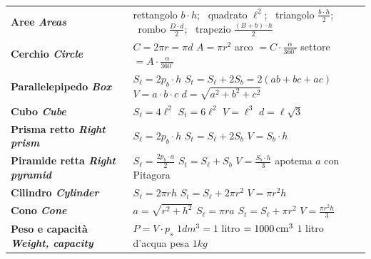 {\begin{tabularx}{\linewidth}{@{}>{\bfseries}p{3.4cm} X@{}}
Aree \newline \textit{\mdseries Areas} & rettangolo $b\cdot h$; \ quadrato $\ell^2$; \ triangolo $\frac{b\cdot h}{2}$; \ rombo $\frac{D\cdot d}{2}$; \ trapezio $\frac{(B+b)\cdot h}{2}$\\
Cerchio \newline \textit{\mdseries Circle} & $C=2\pi r=\pi d$ \qquad $A=\pi r^2$ \qquad arco $=C\cdot\frac{\alpha}{360^\circ}$ \qquad settore $=A\cdot\frac{\alpha}{360^\circ}$\\
Parallelepipedo \newline \textit{\mdseries Box} & $S_\ell=2p_b\cdot h$ \quad $S_t=S_\ell+2S_b=2(ab+bc+ac)$ \quad $V=a\cdot b\cdot c$ \quad $d=\sqrt{a^2+b^2+c^2}$\\
Cubo \newline \textit{\mdseries Cube} & $S_\ell=4\ell^2$ \quad $S_t=6\ell^2$ \quad $V=\ell^3$ \quad $d=\ell\sqrt3$\\
Prisma retto \newline \textit{\mdseries Right prism} & $S_\ell=2p_b\cdot h$ \quad $S_t=S_\ell+2S_b$ \quad $V=S_b\cdot h$\\
Piramide retta \newline \textit{\mdseries Right pyramid} & $S_\ell=\frac{2p_b\cdot a}{2}$ \quad $S_t=S_\ell+S_b$ \quad $V=\frac{S_b\cdot h}{3}$ \quad apotema $a$ con Pitagora\\
Cilindro \newline \textit{\mdseries Cylinder} & $S_\ell=2\pi rh$ \quad $S_t=S_\ell+2\pi r^2$ \quad $V=\pi r^2h$\\
Cono \newline \textit{\mdseries Cone} & $a=\sqrt{r^2+h^2}$ \quad $S_\ell=\pi ra$ \quad $S_t=S_\ell+\pi r^2$ \quad $V=\frac{\pi r^2h}{3}$\\
Peso e capacità \newline \textit{\mdseries Weight, capacity} & $P=V\cdot p_s$ \qquad $1\unit{dm^3}=1$ litro $=1000\,\mathrm{cm^3}$ \qquad $1$ litro d'acqua pesa $1\unit{kg}$\\
\bottomrule
\end{tabularx}
}
